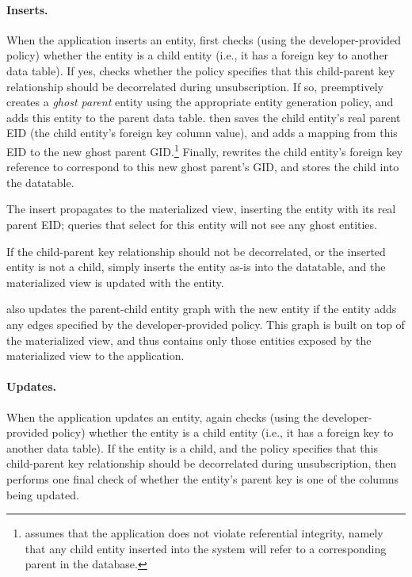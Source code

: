 \paragraph{Inserts.}
When the application inserts an entity, \sys{} first checks (using the developer-provided policy) whether
the entity is a child entity (i.e., it has a foreign key to another data table). 
If yes, \sys{} checks whether the policy specifies that this child-parent key
relationship should be decorrelated during unsubscription. If so, \sys{} preemptively creates a
\emph{ghost parent} entity using the appropriate entity generation policy, and adds this entity to
the parent data table. \sys{} then saves the child entity's real parent EID (the child entity's
foreign key column value), and adds a mapping from this EID to the new ghost parent
GID.\footnote{\sys{} assumes that the application does not violate referential integrity, namely
that any child entity inserted into the system will refer to a corresponding parent in the
database.} Finally, \sys{} rewrites the child entity's foreign key reference to correspond to this
new ghost parent's GID, and stores the child into the datatable.

The insert propagates to the materialized view, inserting the entity with its real parent EID; queries that
select for this entity will not see any ghost entities. 

If the child-parent key relationship should not be decorrelated, or the inserted entity is not a
child, \sys{} simply inserts the entity as-is into the datatable, and the materialized view is
updated with the entity.

\sys{} also updates the parent-child entity graph with the new entity if the entity adds any edges
specified by the developer-provided policy. This graph is built on top of the materialized view, and
thus contains only those entities exposed by the materialized view to the application.

\paragraph{Updates.}
When the application updates an entity, \sys{} again checks (using the developer-provided policy) whether
the entity is a child entity (i.e., it has a foreign key to another data table). 
If the entity is a child, and the policy specifies that this child-parent key
relationship should be decorrelated during unsubscription, then \sys{} performs one final check of
whether the entity's parent key is one of the columns being updated.

